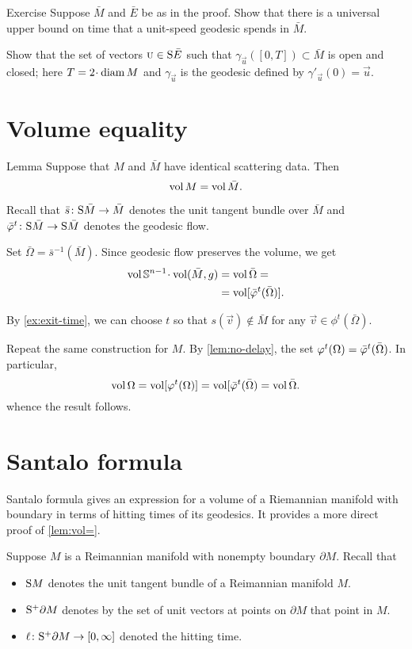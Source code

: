\begin{thm}{Exercise}\label{ex:exit-time}
Suppose $\bar M$ and $\bar E$ be as in the proof.
Show that there is a universal upper bound on time that a unit-speed geodesic spends in $\bar M$.
\end{thm}

 Show that the set of vectors $\vec u\in\S \bar E$ such that $\gamma_{\vec u}([0, T])\subset \bar M$ is open and closed;
here $T=2\cdot\diam M$ and $\gamma_{\vec u}$ is the geodesic defined by $\gamma'_{\vec u}(0)=\vec u$.

\section{Volume equality}

\begin{thm}{Lemma}\label{lem:vol=}
Suppose that $M$ and $\bar M$ have identical scattering data.
Then 
\[\vol M=\vol \bar M.\]

\end{thm}

Recall that $\bar s\:\S \bar M\to \bar M$ denotes the unit tangent bundle over $\bar M$
and $\bar\phi^t\:\S \bar M\to \S \bar M$ denotes the geodesic flow.

Set $\bar\Omega=\bar s^{-1}(\bar M)$.
Since geodesic flow preserves the volume, we get 
\begin{align*}
\vol\SSS^{n-1}\cdot\vol(\bar M,g)&=\vol\bar\Omega=
\\
&=\vol[\bar\phi^t(\bar\Omega)].
\end{align*}

By \ref{ex:exit-time}, we can choose $t$ so that $s(\vec v)\notin \bar M$ for any $\vec v\in \phi^t(\bar\Omega)$.

Repeat the same construction for $M$. 
By \ref{lem:no-delay}, the set $\phi^t(\Omega)\z=\bar\phi^t(\bar\Omega)$.
In particular, 
\[
\vol\Omega=
\vol[\phi^t(\Omega)]=\vol[\bar\phi^t(\bar\Omega)=\vol\bar\Omega.
\]
whence the result follows.
\qeds

\section{Santalo formula}

Santalo formula gives an expression for a volume of a Riemannian manifold with boundary in terms of hitting times of its geodesics.
It provides a more direct proof of \ref{lem:vol=}.

Suppose $M$ is a Reimannian manifold with nonempty boundary $\partial M$.
Recall that 
\begin{itemize}
\item $\S M$ denotes the unit tangent bundle of a Reimannian manifold $M$.
\item $\S^+ \partial M$ denotes by the set of unit vectors at points on $\partial M$ that point in $M$.
\item $\ell\:\S^+ \partial M\to [0,\infty]$ denoted the hitting time.
\end{itemize}

